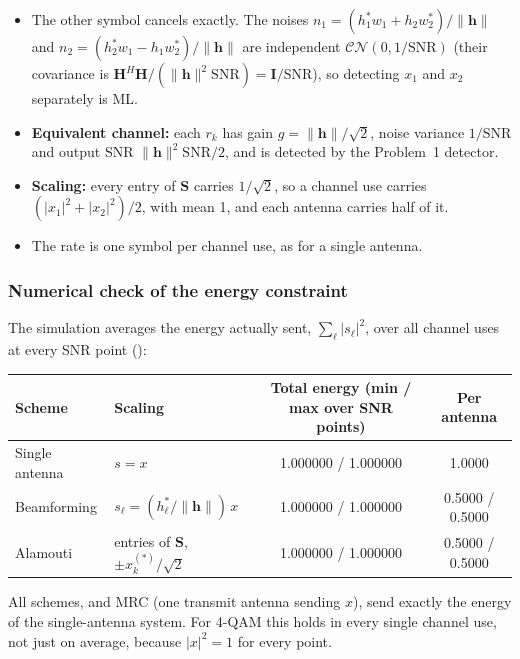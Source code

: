 \documentclass[11pt,a4paper]{article}
\newcommand{\snr}{\mathrm{SNR}}
\newcommand{\CN}{\mathcal{CN}}
\newcommand{\norm}[1]{\lVert #1 \rVert}
\newcommand{\abs}[1]{\lvert #1 \rvert}
\newcommand{\h}{\mathbf{h}}
\newcommand{\code}[1]{\texttt{\detokenize{#1}}}
\begin{document}
\begin{itemize}
  \item The other symbol cancels exactly. The noises
        $n_1 = (h_1^*w_1 + h_2w_2^*)/\norm{\h}$ and
        $n_2 = (h_2^*w_1 - h_1w_2^*)/\norm{\h}$ are independent $\CN(0, 1/\snr)$
        (their covariance is $\mathbf{H}^H\mathbf{H}/(\norm{\h}^2\snr) = \mathbf{I}/\snr$),
        so detecting $x_1$ and $x_2$ separately is ML.
  \item \textbf{Equivalent channel:} each $r_k$ has gain $g = \norm{\h}/\sqrt2$, noise
        variance $1/\snr$ and output SNR $\norm{\h}^2\snr/2$, and is detected by the
        Problem~1 detector.
  \item \textbf{Scaling:} every entry of $\mathbf{S}$ carries $1/\sqrt2$, so a channel
        use carries $(\abs{x_1}^2 + \abs{x_2}^2)/2$, with mean 1, and each antenna
        carries half of it.
  \item The rate is one symbol per channel use, as for a single antenna.
\end{itemize}

\subsubsection{Numerical check of the energy constraint}
\label{sec:p3-energy}

The simulation averages the energy actually sent, $\sum_\ell \abs{s_\ell}^2$, over all
channel uses at every SNR point (\code{results/q3/summary.txt}):
\begin{center}\small
  \begin{tabular}{@{}llcc@{}}
    \toprule
    Scheme & Scaling & Total energy (min / max over SNR points) & Per antenna \\
    \midrule
    Single antenna & $s = x$ & 1.000000 / 1.000000 & 1.0000 \\
    Beamforming    & $s_\ell = (h_\ell^*/\norm{\h})\,x$ & 1.000000 / 1.000000 & 0.5000 / 0.5000 \\
    Alamouti       & entries of $\mathbf{S}$, $\pm x_k^{(*)}/\sqrt2$ & 1.000000 / 1.000000 & 0.5000 / 0.5000 \\
    \bottomrule
  \end{tabular}
\end{center}
All schemes, and MRC (one transmit antenna sending $x$), send exactly the energy of
the single-antenna system. For 4-QAM this holds in every single channel use, not
just on average, because $\abs{x}^2 = 1$ for every point.
\end{document}
